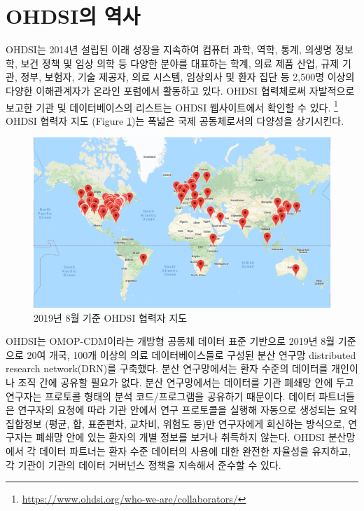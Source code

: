 \documentclass[10.5pt]{book}
\let\rmarkdownfootnote\footnote%
\def\footnote{\protect\rmarkdownfootnote}
\theoremstyle{definition}
\theoremstyle{definition}
\theoremstyle{definition}
\theoremstyle{remark}
\begin{document}

\hypertarget{ohdsi-}{\section{OHDSI의 역사}\label{ohdsi-}}

OHDSI는 2014년 설립된 이래 성장을 지속하여 컴퓨터 과학, 역학, 통계,
의생명 정보학, 보건 정책 및 임상 의학 등 다양한 분야를 대표하는 학계,
의료 제품 산업, 규제 기관, 정부, 보험자, 기술 제공자, 의료 시스템,
임상의사 및 환자 집단 등 2,500명 이상의 다양한 이해관계자가 온라인
포럼에서 활동하고 있다. OHDSI 협력체로써 자발적으로 보고한 기관 및
데이터베이스의 리스트는 OHDSI 웹사이트에서 확인할 수 있다. \footnote{\url{https://www.ohdsi.org/who-we-are/collaborators/}}
OHDSI 협력자 지도 (Figure \ref{fig:collaboratormap})는 폭넓은 국제
공동체로서의 다양성을 상기시킨다.

\begin{figure}

{\centering \includegraphics[width=1\linewidth]{images/OhdsiCommunity/mapOfCollaborators} 

}

\caption{2019년 8월 기준 OHDSI 협력자 지도}\label{fig:collaboratormap}
\end{figure}

OHDSI는 OMOP-CDM이라는 개방형 공동체 데이터 표준 기반으로 2019년 8월
기준으로 20여 개국, 100개 이상의 의료 데이터베이스들로 구성된 분산
연구망 distributed research network(DRN)를 구축했다. 분산 연구망에서는
환자 수준의 데이터를 개인이나 조직 간에 공유할 필요가 없다. 분산
연구망에서는 데이터를 기관 폐쇄망 안에 두고 연구자는 프로토콜 형태의
분석 코드/프로그램을 공유하기 때문이다. 데이터 파트너들은 연구자의
요청에 따라 기관 안에서 연구 프로토콜을 실행해 자동으로 생성되는 요약
집합정보 (평균, 합, 표준편차, 교차비, 위험도 등)만 연구자에게 회신하는
방식으로, 연구자는 폐쇄망 안에 있는 환자의 개별 정보를 보거나 취득하지
않는다. OHDSI 분산망에서 각 데이터 파트너는 환자 수준 데이터의 사용에
대한 완전한 자율성을 유지하고, 각 기관이 기관의 데이터 거버넌스 정책을
지속해서 준수할 수 있다.
\end{document}
